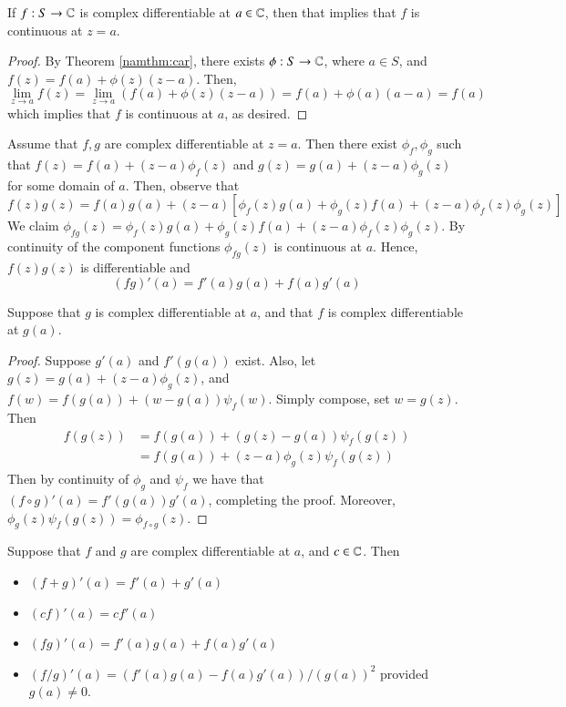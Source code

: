 \documentclass[12pt, a4paper, oneside, openright, titlepage]{book}
\begin{document}
\begin{thm}
    If $f:S\rightarrow \mathbb C$ is complex differentiable at $a \in \mathbb C$, then that implies that $f$ is continuous at $z = a$. 
\end{thm}
\begin{proof}
    By Theorem \ref{namthm:car}, there exists $\phi:S\rightarrow \mathbb C$, where $a \in S$, and $f(z) = f(a)+\phi(z)(z-a)$. Then, \begin{equation*}
        \lim\limits_{z\rightarrow a}f(z) = \lim\limits_{z\rightarrow a}(f(a)+\phi(z)(z-a)) = f(a) + \phi(a)(a-a) = f(a)
    \end{equation*}
    which implies that $f$ is continuous at $a$, as desired.
\end{proof}

Assume that $f,g$ are complex differentiable at $z = a$. Then there exist $\phi_f,\phi_g$ such that $f(z) = f(a) + (z-a)\phi_f(z)$ and $g(z) = g(a)+(z-a)\phi_g(z)$ for some domain of $a$. Then, observe that \begin{equation*}
    f(z)g(z) = f(a)g(a) + (z-a)[\phi_f(z)g(a)+\phi_g(z)f(a) + (z-a)\phi_f(z)\phi_g(z)]
\end{equation*}
We claim $\phi_{fg}(z) = \phi_f(z)g(a)+\phi_g(z)f(a) + (z-a)\phi_f(z)\phi_g(z)$. By continuity of the component functions $\phi_{fg}(z)$ is continuous at $a$. Hence, $f(z)g(z)$ is differentiable and \begin{equation*}
    (fg)'(a) = f'(a)g(a)+f(a)g'(a)
\end{equation*}


\begin{thm}
    Suppose that $g$ is complex differentiable at $a$, and that $f$ is complex differentiable at $g(a)$.
\end{thm}
\begin{proof}
    Suppose $g'(a)$ and $f'(g(a))$ exist. Also, let $g(z) = g(a)+(z-a)\phi_g(z)$, and $f(w) = f(g(a)) + (w-g(a))\psi_f(w)$. Simply compose, set $w = g(z)$. Then \begin{align*}
        f(g(z)) &= f(g(a)) + (g(z) - g(a))\psi_f(g(z)) \\
        &= f(g(a)) + (z-a)\phi_g(z)\psi_f(g(z))
    \end{align*}
    Then by continuity of $\phi_g$ and $\psi_f$ we have that $(f\circ g)'(a) = f'(g(a))g'(a)$, completing the proof. Moreover, $\phi_g(z) \psi_f(g(z)) = \phi_{f\circ g}(z)$.
\end{proof}

\begin{thm}
    Suppose that $f$ and $g$ are complex differentiable at $a$, and $c \in \mathbb C$. Then \begin{itemize}
        \item $(f+g)'(a) = f'(a)+g'(a)$
        \item $(cf)'(a) = cf'(a)$
        \item $(fg)'(a) = f'(a)g(a) + f(a)g'(a)$
        \item $(f/g)'(a) = (f'(a)g(a) - f(a)g'(a))/(g(a))^2$ provided $g(a) \neq 0$.
    \end{itemize}
\end{thm}
\end{document}
